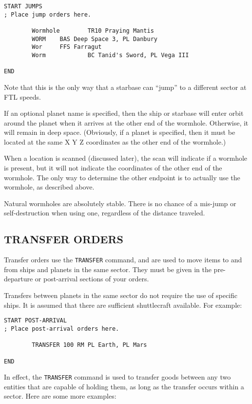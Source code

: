 \documentclass[10pt,titlepage]{article}
\begin{document}
\begin{verbatim}
START JUMPS
; Place jump orders here.

        Wormhole        TR10 Praying Mantis
        WORM    BAS Deep Space 3, PL Danbury
        Wor     FFS Farragut
        Worm            BC Tanid's Sword, PL Vega III

END
\end{verbatim} 

Note that this is the only way that a starbase can ``jump'' to a different
sector at FTL speeds.

If an optional planet name is specified, then the ship or starbase will enter
orbit around the planet when it arrives at the other end of the wormhole.
Otherwise, it will remain in deep space.  (Obviously, if a planet is specified,
then it must be located at the same X Y Z coordinates as the other end of the
wormhole.)

When a location is scanned (discussed later), the scan will indicate if a
wormhole is present, but it will not indicate the coordinates of the other end
of the wormhole.  The only way to determine the other endpoint is to actually
use the wormhole, as described above.

Natural wormholes are absolutely stable.  There is no chance of a mis-jump or
self-destruction when using one, regardless of the distance traveled.


\subsection{TRANSFER ORDERS}
\label{sec:transferorders}


Transfer orders use the \texttt{TRANSFER} command, and are used to move items to and
from ships and planets in the same sector.  They must be given in the pre-
departure or post-arrival sections of your orders.

Transfers between planets in the same sector do not require the use of specific
ships.  It is assumed that there are sufficient shuttlecraft available.  For
example:

\begin{verbatim}
START POST-ARRIVAL
; Place post-arrival orders here.

        TRANSFER 100 RM PL Earth, PL Mars

END
\end{verbatim} 

In effect, the \texttt{TRANSFER} command is used to transfer goods between any two
entities that are capable of holding them, as long as the transfer occurs
within a sector.  Here are some more examples:
\end{document}
